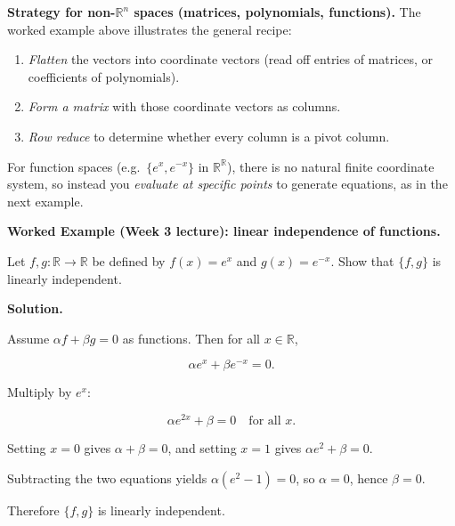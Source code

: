 \begin{policynote}
\textbf{Strategy for non-$\mathbb{R}^n$ spaces (matrices, polynomials, functions).}
The worked example above illustrates the general recipe:
\begin{enumerate}[leftmargin=*]
\item \emph{Flatten} the vectors into coordinate vectors (read off entries of matrices, or coefficients of polynomials).
\item \emph{Form a matrix} with those coordinate vectors as columns.
\item \emph{Row reduce} to determine whether every column is a pivot column.
\end{enumerate}
For function spaces (e.g.\ $\{e^x,e^{-x}\}$ in $\mathbb{R}^{\mathbb{R}}$), there is no natural finite coordinate system, so instead you \emph{evaluate at specific points} to generate equations, as in the next example.
\end{policynote}

\begin{examplebox}

\textbf{Worked Example (Week 3 lecture): linear independence of functions.}

Let $f,g:\mathbb{R}\to\mathbb{R}$ be defined by $f(x)=e^x$ and $g(x)=e^{-x}$. Show that $\{f,g\}$ is linearly independent.

\medskip

\textbf{Solution.}

Assume $\alpha f+\beta g=0$ as functions. Then for all $x\in\mathbb{R}$,

\[
\alpha e^x+\beta e^{-x}=0.
\]

Multiply by $e^x$:

\[
\alpha e^{2x}+\beta=0 \quad\text{for all }x.
\]

Setting $x=0$ gives $\alpha+\beta=0$, and setting $x=1$ gives $\alpha e^{2}+\beta=0$.

Subtracting the two equations yields $\alpha(e^2-1)=0$, so $\alpha=0$, hence $\beta=0$.

Therefore $\{f,g\}$ is linearly independent.

\end{examplebox}

